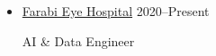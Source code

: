 \documentclass[11pt,a4paper,sans]{moderncv} %
\begin{document}
\begin{itemize}
			
			
			
		\vspace{1em}
		\item \href{https://en.tums.ac.ir/en/page/97/farabi-hospital}{ Farabi Eye Hospital} \hfill 2020--Present
		
        AI \& Data Engineer
    		

\end{itemize}
\end{document}
